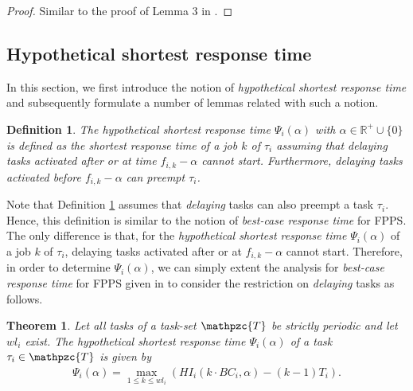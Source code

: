 \documentclass[fleqn]{article}
\newtheorem{theorem}{Theorem}
\newtheorem{definition}{Definition}
\begin{document}
\begin{proof}
	Similar to the proof of Lemma 3 in \cite{BLM13}.
\end{proof}

\subsection{Hypothetical shortest response time}
In this section, we first introduce the notion of \textit{hypothetical shortest response time} and subsequently formulate a number of lemmas related with such a notion.

\begin{definition} \label{hsrt_def}
The \textit{hypothetical shortest response time} $\Psi_i(\alpha)$ with $\alpha \in \mathbb{R^+} \cup \{0\}$ is defined as the shortest response time of a job $k$ of $\tau_i$ assuming that delaying tasks activated after or at time $f_{i,k}-\alpha$ cannot start. Furthermore, delaying tasks activated before $f_{i,k}-\alpha$ can preempt $\tau_i$.
\end{definition}

Note that Definition \ref{hsrt_def} assumes that \textit{delaying} tasks can also preempt a task $\tau_i$. Hence, this definition is similar to the notion of \textit{best-case response time} for FPPS. The only difference is that, for the \textit{hypothetical shortest response time} $\Psi_i(\alpha)$ of a job $k$ of $\tau_i$, delaying tasks activated after or at $f_{i,k}-\alpha$ cannot start. Therefore, in order to determine $\Psi_i(\alpha)$, we can simply extent the analysis for \textit{best-case response time} for FPPS given in \cite{BLM13} to consider the restriction on \textit{delaying} tasks as follows.

\begin{theorem}
	Let all tasks of a task-set $\mathpzc{T}$ be strictly periodic and let $wl_i$ exist. The \textit{hypothetical shortest response time} $\Psi_i(\alpha)$ of a task $\tau_i \in \mathpzc{T}$ is given by
	\begin{align}
	\Psi_i(\alpha) = \max \limits_{1 \leq k \leq wl_i} (HI_i(k \cdot BC_i, \alpha) - (k-1)T_i).
	\end{align}
\end{theorem}
\end{document}
